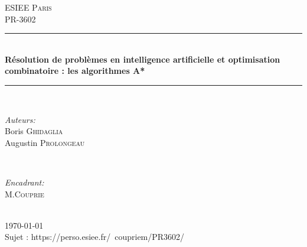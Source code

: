 \documentclass[11pt]{article} %
\begin{document}
\newcommand{\p}[1]{\par\noindent{#1}\\}
\newcommand{\pnr}[1]{\par\noindent{#1}}
\newcommand{\q}[1]{\par\noindent{\textbf{#1}}}
\newcommand{\m}[1]{\[#1\]}
\newcommand{\mt}[1]{$#1$}
\newcommand{\green}[1]{\textcolor{green}{#1}}


\begin{titlepage}

\newcommand{\HRule}{\rule{\linewidth}{0.5mm}} %

\center %

\textsc{\LARGE ESIEE Paris}\\[1.5cm] %
\textsc{\Large PR-3602}\\[0.5cm] %

\HRule \\[0.4cm]
{ \huge \bfseries Résolution de problèmes en intelligence artificielle et optimisation
 combinatoire : les algorithmes A*} %
\HRule \\[4cm]

\begin{minipage}{0.4\textwidth}
\begin{flushleft} \large
\emph{Auteurs:}\\
Boris \textsc{Ghidaglia}\\ %
Augustin \textsc{Prolongeau}\\ %
\end{flushleft}
\end{minipage}
~
\begin{minipage}{0.4\textwidth}
\begin{flushright} \large
\emph{Encadrant:} \\
M.\textsc{Couprie} %
\end{flushright}
\end{minipage}\\[4cm]

{\large \today}\\[3cm] %

{Sujet : https://perso.esiee.fr/~coupriem/PR3602/}


\vfill %

\end{titlepage}
\end{document}
